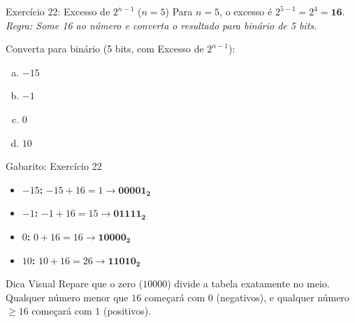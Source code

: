\begin{frame}{Exercício 22: Excesso de $2^{n-1}$ ($n=5$)}
    Para $n=5$, o excesso é $2^{5-1} = 2^4 = \mathbf{16}$.\\
    \textit{Regra: Some 16 ao número e converta o resultado para binário de 5 bits.}


    Converta para binário (5 bits, com Excesso de $2^{n-1}$):
    \begin{enumerate}[a)]
        \item $-15$
        \item $-1$
        \item $0$
        \item $10$
    \end{enumerate}
\end{frame}

\begin{frame}{Gabarito: Exercício 22}
    \begin{itemize}
        \item[\textbf{a)}] \textbf{$-15$:} $-15 + 16 = 1 \rightarrow \mathbf{00001_2}$
        \item[\textbf{b)}] \textbf{$-1$:} $-1 + 16 = 15 \rightarrow \mathbf{01111_2}$
        \item[\textbf{c)}] \textbf{$0$:} $0 + 16 = 16 \rightarrow \mathbf{10000_2}$
        \item[\textbf{d)}] \textbf{$10$:} $10 + 16 = 26 \rightarrow \mathbf{11010_2}$
    \end{itemize}

    \begin{exampleblock}{Dica Visual}
        Repare que o zero ($10000$) divide a tabela exatamente no meio. Qualquer número menor que $16$ começará com $0$ (negativos), e qualquer número $\geq 16$ começará com $1$ (positivos).
    \end{exampleblock}
\end{frame}
